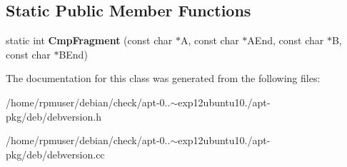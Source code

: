\subsection*{\-Static \-Public \-Member \-Functions}
\begin{DoxyCompactItemize}
\item 
static int {\bfseries \-Cmp\-Fragment} (const char $\ast$\-A, const char $\ast$\-A\-End, const char $\ast$\-B, const char $\ast$\-B\-End)\label{classdebVersioningSystem_a2c013b6f327bdb302d0dcfcb646f1472}

\end{DoxyCompactItemize}


\-The documentation for this class was generated from the following files\-:\begin{DoxyCompactItemize}
\item 
/home/rpmuser/debian/check/apt-\/0..$\sim$exp12ubuntu10./apt-\/pkg/deb/debversion.\-h\item 
/home/rpmuser/debian/check/apt-\/0..$\sim$exp12ubuntu10./apt-\/pkg/deb/debversion.\-cc\end{DoxyCompactItemize}
